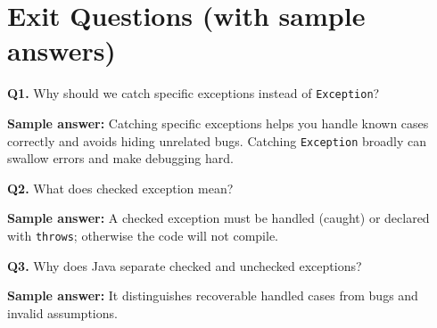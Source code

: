 \documentclass[11pt]{article}
\begin{document}
\section{Exit Questions (with sample answers)}
\textbf{Q1.} Why should we catch specific exceptions instead of \texttt{Exception}?\par
\textbf{Sample answer:} Catching specific exceptions helps you handle known cases correctly and avoids hiding unrelated bugs. Catching \texttt{Exception} broadly can swallow errors and make debugging hard.

\vspace{0.6em}
\textbf{Q2.} What does checked exception mean?\par
\textbf{Sample answer:} A checked exception must be handled (caught) or declared with \texttt{throws}; otherwise the code will not compile.

\vspace{0.6em}
\textbf{Q3.} Why does Java separate checked and unchecked exceptions?\par
\textbf{Sample answer:} It distinguishes recoverable handled cases from bugs and invalid assumptions.
\end{document}
